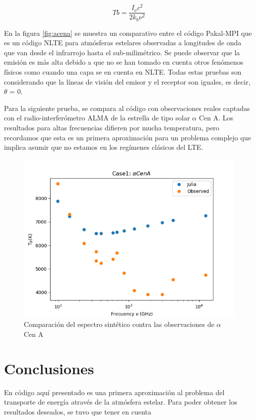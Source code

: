 \documentclass[a4paper]{article}
\begin{document}
$$ Tb = \frac{I_\nu c^2}{2 k_b \nu^2} $$

En la figura \ref{fig:acena} se muestra un comparativo entre el código Pakal-MPI que es un código NLTE para atmósferas estelares observadas a longitudes de onda que van desde el infrarrojo hasta el sub-milimétrico. Se puede observar que la emisión es más alta debido a que no se han tomado en cuenta otros fenómenos físicos como cuando una capa se en cuenta en NLTE. Todas estas pruebas son considerando que la líneas de visión del emisor y el receptor son iguales, es decir, $\theta$ = 0.

Para la siguiente prueba, se compara al código con observaciones reales captadas con el radio-interferómetro ALMA de la estrella de tipo solar $\alpha$ Cen A. Los resultados para altas frecuencias difieren por mucha temperatura, pero recordamos que esta es un primera aproximación para un problema complejo que implica asumir que no estamos en los regímenes clásicos del LTE.

\begin{figure}[!htbp]
\begin{center}
\includegraphics[width=15cm]{acena.png}
\end{center}
\caption{Comparación del espectro sintético contra las observaciones de $\alpha$ Cen A}\label{acena}
\end{figure}

\section{Conclusiones}

En código aquí presentado es una primera aproximación al problema del transporte de energía através de la atmósfera estelar. Para poder obtener los resultados deseados, se tuvo que tener en cuenta 
\end{document}
